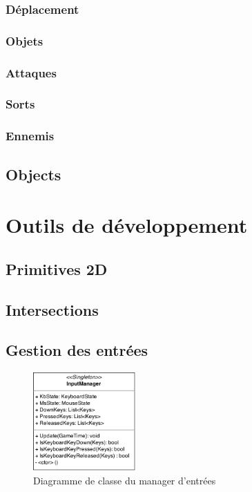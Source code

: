 \documentclass[11pt, a4paper, oneside]{report}
\begin{document}
\subsubsection{Déplacement}
\subsubsection{Objets}
\subsubsection{Attaques}
\subsubsection{Sorts}
\subsubsection{Ennemis}
\subsection{Objects}
\section{Outils de développement}
\subsection{Primitives 2D}
\subsection{Intersections}
\label{subsec:intersections}
\subsection{Gestion des entrées}
\begin{figure}[H]
	\begin{center}
	\includegraphics[width=0.35\textwidth]{InputManager}
	\caption{Diagramme de classe du manager d'entrées}
	\label{fig:InputManager}
	\end{center}
\end{figure}
\end{document}
